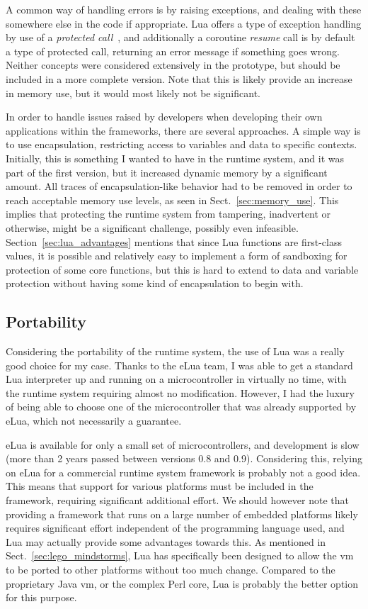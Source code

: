 \noindent
A common way of handling errors is by raising exceptions, and dealing with these somewhere else in the code if appropriate. Lua offers a type of exception handling by use of a \emph{protected call}~\cite[Ch.8.4]{book:programming_in_lua_first}, and additionally a coroutine \emph{resume} call is by default a type of protected call, returning an error message if something goes wrong. Neither concepts were considered extensively in the prototype, but should be included in a more complete version. Note that this is likely provide an increase in memory use, but it would most likely not be significant.

\noindent
In order to handle issues raised by developers when developing their own applications within the frameworks, there are several approaches. A simple way is to use encapsulation, restricting access to variables and data to specific contexts. Initially, this is something I wanted to have in the runtime system, and it was part of the first version, but it increased dynamic memory by a significant amount. All traces of encapsulation-like behavior had to be removed in order to reach acceptable memory use levels, as seen in Sect.~\ref{sec:memory_use}. This implies that protecting the runtime system from tampering, inadvertent or otherwise, might be a significant challenge, possibly even infeasible. Section~\ref{sec:lua_advantages} mentions that since Lua functions are first-class values, it is possible and relatively easy to implement a form of sandboxing for protection of some core functions, but this is hard to extend to data and variable protection without having some kind of encapsulation to begin with.

\subsection{Portability}
\label{sec:disq_portability}
Considering the portability of the runtime system, the use of Lua was a really good choice for my case. Thanks to the eLua team, I was able to get a standard Lua interpreter up and running on a microcontroller in virtually no time, with the runtime system requiring almost no modification. However, I had the luxury of being able to choose one of the microcontroller that was already supported by eLua, which not necessarily a guarantee.

\noindent
eLua is available for only a small set of microcontrollers, and development is slow (more than 2 years passed between versions 0.8 and 0.9). Considering this, relying on eLua for a commercial runtime system framework is probably not a good idea. This means that support for various platforms must be included in the framework, requiring significant additional effort. We should however note that providing a framework that runs on a large number of embedded platforms likely requires significant effort independent of the programming language used, and Lua may actually provide some advantages towards this. As mentioned in Sect.~\ref{sec:lego_mindstorms}, Lua has specifically been designed to allow the \gls{vm} to be ported to other platforms without too much change. Compared to the proprietary Java \gls{vm}, or the complex Perl core, Lua is probably the better option for this purpose.

